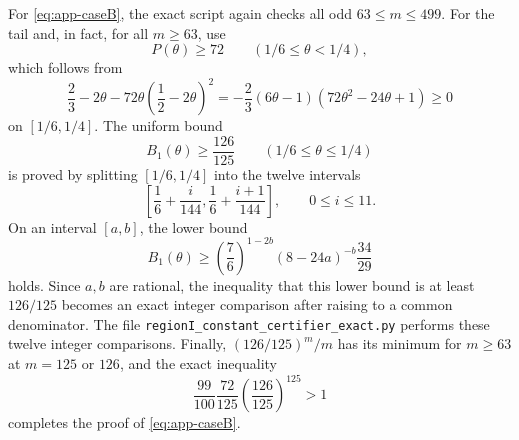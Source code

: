 \documentclass[11pt]{article}
\begin{document}
For \eqref{eq:app-caseB}, the exact script again checks all odd $63\le m\le499$.  For the tail and, in fact, for all $m\ge63$, use
\[
        P(\theta)\ge72
        \qquad(1/6\le\theta<1/4),
\]
which follows from
\[
        \frac23-2\theta-72\theta\left(\frac12-2\theta\right)^2
        =-\frac23(6\theta-1)(72\theta^2-24\theta+1)
        \ge0
\]
on $[1/6,1/4]$.  The uniform bound
\[
        B_1(\theta)\ge\frac{126}{125}
        \qquad(1/6\le\theta\le1/4)
\]
is proved by splitting $[1/6,1/4]$ into the twelve intervals
\[
        \left[\frac16+\frac{i}{144},\frac16+\frac{i+1}{144}\right],
        \qquad 0\le i\le11.
\]
On an interval $[a,b]$, the lower bound
\[
        B_1(\theta)\ge
        \left(\frac76\right)^{1-2b}(8-24a)^{-b}\frac{34}{29}
\]
holds.  Since $a,b$ are rational, the inequality that this lower bound is at least $126/125$ becomes an exact integer comparison after raising to a common denominator.  The file \texttt{regionI\_constant\_certifier\_exact.py} performs these twelve integer comparisons.  Finally, $(126/125)^m/m$ has its minimum for $m\ge63$ at $m=125$ or $126$, and the exact inequality
\[
        \frac{99}{100}\frac{72}{125}\left(\frac{126}{125}\right)^{125}>1
\]
completes the proof of \eqref{eq:app-caseB}.
\end{document}
